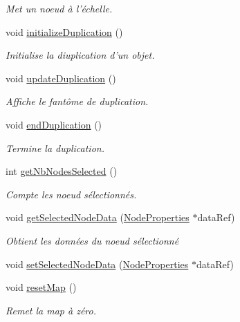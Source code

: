\begin{DoxyCompactItemize}
\begin{DoxyCompactList}\small\item\em Met un noeud à l'échelle. \end{DoxyCompactList}\item 
void \hyperlink{group__inf2990_ga6f50ec221ffc9a37a80fc87b9241000e}{initialize\-Duplication} ()
\begin{DoxyCompactList}\small\item\em Initialise la diuplication d'un objet. \end{DoxyCompactList}\item 
void \hyperlink{group__inf2990_ga1a3e0ca25ffb4442968ce0977ca37d45}{update\-Duplication} ()
\begin{DoxyCompactList}\small\item\em Affiche le fantôme de duplication. \end{DoxyCompactList}\item 
void \hyperlink{group__inf2990_ga236c0dba051c913078932ea1cf4a2e76}{end\-Duplication} ()
\begin{DoxyCompactList}\small\item\em Termine la duplication. \end{DoxyCompactList}\item 
int \hyperlink{group__inf2990_gac85e226dae7761e7e98e0df151c5a766}{get\-Nb\-Nodes\-Selected} ()
\begin{DoxyCompactList}\small\item\em Compte les noeud sélectionnés. \end{DoxyCompactList}\item 
void \hyperlink{group__inf2990_ga7dfe6c0df984dd4d2c5402d9fab0fc75}{get\-Selected\-Node\-Data} (\hyperlink{struct_node_properties}{Node\-Properties} $\ast$data\-Ref)
\begin{DoxyCompactList}\small\item\em Obtient les données du noeud sélectionné \end{DoxyCompactList}\item 
void \hyperlink{group__inf2990_gae40b907a6c30f55176cde6b1736eaf72}{set\-Selected\-Node\-Data} (\hyperlink{struct_node_properties}{Node\-Properties} $\ast$data\-Ref)
\item 
void \hyperlink{group__inf2990_gace5ff9435d6bcf501298d401207733bf}{reset\-Map} ()
\begin{DoxyCompactList}\small\item\em Remet la map à zéro. \end{DoxyCompactList}\item 

\end{DoxyCompactItemize}
